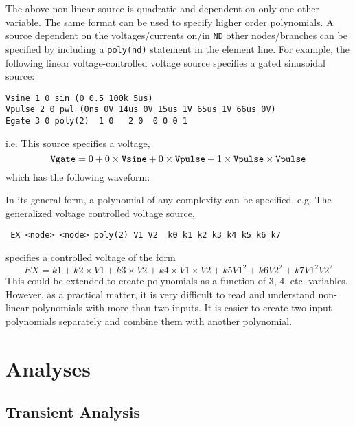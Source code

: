 The above non-linear source is quadratic and dependent on only one
other variable.
The same format can be used to specify higher order polynomials.
A source dependent on the voltages/currents on/in {\tt ND} other nodes/branches
can be specified by including a {\tt poly(nd)} statement in the element line.
For example, the following linear
voltage-controlled voltage source specifies a gated sinusoidal source:
\par\noindent
\centerline{}
\par\noindent
\begin{center}
{\tt\begin{verbatim}
Vsine 1 0 sin (0 0.5 100k 5us)
Vpulse 2 0 pwl (0ns 0V 14us 0V 15us 1V 65us 1V 66us 0V)
Egate 3 0 poly(2)  1 0   2 0  0 0 0 1
\end{verbatim} }
\end{center}

i.e. This source specifies a voltage,
\[
{\tt Vgate} = 0 + 0\times {\tt Vsine}
    +0\times {\tt Vpulse} + 1 \times {\tt Vpulse} \times {\tt Vpulse}
\]
which has the following waveform:\\
\centerline{}
\vspace{3mm}\par\noindent
In its general form, a polynomial of any complexity can be specified.  e.g.
The generalized voltage controlled voltage source,
{\tt\begin{verbatim} EX <node> <node> poly(2) V1 V2  k0 k1 k2 k3 k4 k5 k6 k7
\end{verbatim}
}
\par\noindent
specifies a controlled voltage of the form
\[
  EX = k1 + k2\times V1 + k3\times V2 + k4\times V1\times V2 + k5 V1^2 + k6 V2^2
    + k7 V1^2 V2^2
\]
This could be extended to create polynomials as a function of 3, 4, etc.
variables.  However, as a practical matter, it is very difficult to
read and understand non-linear polynomials with more than two inputs.
It is easier
to create two-input polynomials separately and combine them with
another polynomial.

\section{Analyses}

\subsection{Transient Analysis}

